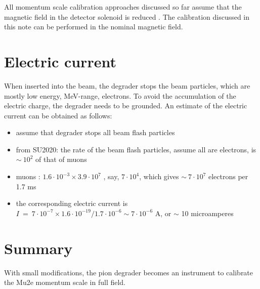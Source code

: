 \documentclass[12pt]{article}
\begin{document}
All momentum scale calibration approaches discussed so far assume that the magnetic field
in the detector solenoid is reduced \cite{MU2E_48630_PIPLUSENU}.
The calibration discussed in this note can be performed in the nominal magnetic field.






\section{Electric current}
When inserted into the beam, the degrader stops the beam particles, which are
mostly low energy, MeV-range, electrons. To avoid the accumulation of the electric charge,
the degrader needs to be grounded. An estimate of the electric current can be obtained
as follows:
\begin{itemize}
\item
  assume that degrader stops all beam flash particles
\item
  from SU2020: the rate of the beam flash particles, assume all are electrons, is $\sim ~ 10^2$ of that of muons
\item
  muons : $1.6 \cdot 10^{-3} \times 3.9 \cdot 10^7$ , say, $7 \cdot 10^4$, which gives $\sim ~ 7 \cdot 10^7$ electrons per 1.7 ms
\item
  the corresponding electric current is $I ~=~ 7 \cdot 10^{-7} \times 1.6 \cdot 10^{-19} / {1.7 \cdot 10^{-6}} \sim 7 \cdot 10^{-6}$ A,
  or $\sim$ 10 microamperes
\end{itemize}



\section {Summary}

With small modifications, the pion degrader becomes an instrument to calibrate the Mu2e
momentum scale in full field.


%
\newpage



% 

\end{document}
